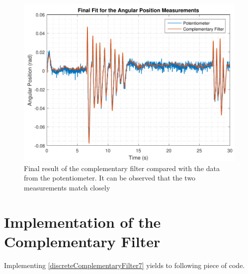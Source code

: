 %
\begin{figure}[H]
	\centering
	\includegraphics[scale=0.65]{figures/filterSensTool}
	\caption{Final result of the complementary filter compared with the data from the potentiometer. It can be observed that the two measurements match closely}
	\label{filterSensTool}
\end{figure}\vspace{-5mm}
%

\section{Implementation of the Complementary Filter}
Implementing \eqref{discreteComplementaryFilter7} yields to following piece of code. 

